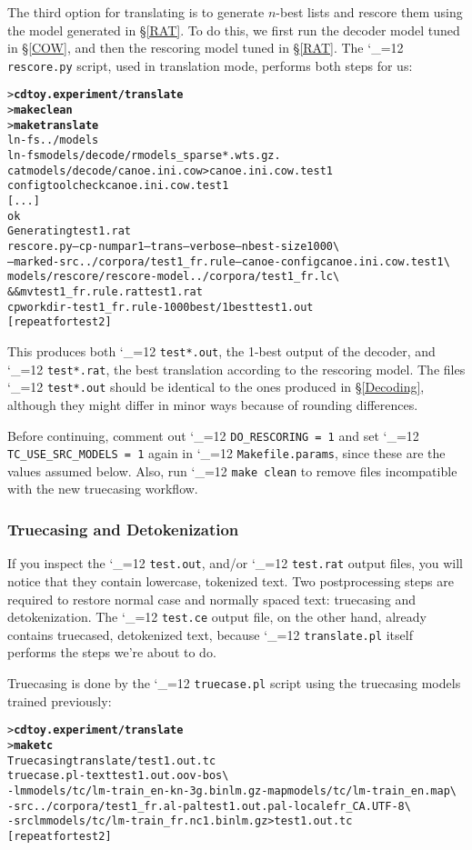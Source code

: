 \documentclass[11pt,letterpaper]{article}
\newcommand{\bs}{\textbackslash{}}
\def\code{\begingroup\catcode`\_=12 \codex}
\newcommand{\codex}[1]{\texttt{#1}\endgroup}
\begin{document}
The third option for translating is to generate $n$-best lists and rescore
them using the model generated in \S\ref{RAT}. To do this, we first run
the decoder model tuned in \S\ref{COW}, and then the rescoring model
tuned in \S\ref{RAT}.  The \code{rescore.py} script, used in translation
mode, performs both steps for us:
\begin{small}
\begin{alltt}
   > \textbf{cd toy.experiment/translate}
   > \textbf{make clean}
   > \textbf{make translate}
   ln -fs ../models
   ln -fs models/decode/rmodels_sparse*.wts.gz .
   cat models/decode/canoe.ini.cow > canoe.ini.cow.test1
   configtool check canoe.ini.cow.test1
   [...]
   ok
   Generating test1.rat
   rescore.py --cp-numpar 1 --trans --verbose --nbest-size 1000 \bs
      --marked-src ../corpora/test1_fr.rule --canoe-config canoe.ini.cow.test1 \bs
      models/rescore/rescore-model ../corpora/test1_fr.lc \bs
      && mv test1_fr.rule.rat test1.rat
   cp workdir-test1_fr.rule-1000best/1best test1.out
   [repeat for test2]
\end{alltt}
\end{small}
This produces both \code{test*.out}, the 1-best output of the decoder, and
\code{test*.rat}, the best translation according to the rescoring model.  The
files \code{test*.out} should be identical to the ones produced in
\S\ref{Decoding}, although they might differ in minor ways because of
rounding differences.

Before continuing, comment out \code{DO_RESCORING = 1} and set
\code{TC_USE_SRC_MODELS = 1} again in \code{Makefile.params}, since these are
the values assumed below.  Also, run \code{make clean} to remove files
incompatible with the new truecasing workflow.

\subsubsection{Truecasing and Detokenization} \label{Truecasing}

If you inspect the \code{test.out}, and/or \code{test.rat} output files, you
will notice that they contain lowercase, tokenized text.  Two postprocessing steps
are required to restore normal case and normally spaced text: truecasing and
detokenization.  The \code{test.ce} output file, on the other hand, already
contains truecased, detokenized text, because \code{translate.pl} itself
performs the steps we're about to do.

Truecasing is done by the \code{truecase.pl} script using the truecasing models
trained previously:
\begin{small}
\begin{alltt}
   > \textbf{cd toy.experiment/translate}
   > \textbf{make tc}
   Truecasing translate/test1.out.tc
   truecase.pl -text test1.out.oov -bos \bs
      -lm models/tc/lm-train_en-kn-3g.binlm.gz -map models/tc/lm-train_en.map \bs
      -src ../corpora/test1_fr.al -pal test1.out.pal -locale fr_CA.UTF-8 \bs
      -srclm models/tc/lm-train_fr.nc1.binlm.gz > test1.out.tc
   [repeat for test2]
\end{alltt}
\end{small}
\end{document}
